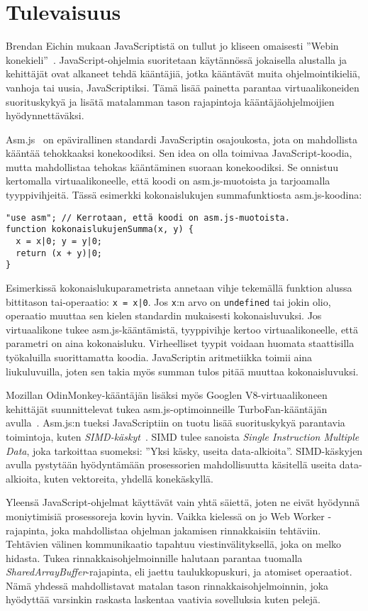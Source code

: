\section{Tulevaisuus}

Brendan Eichin mukaan JavaScriptistä on tullut jo kliseen omaisesti ''Webin konekieli''~\cite{webassembly}. JavaScript-ohjelmia suoritetaan käytännössä jokaisella alustalla ja kehittäjät ovat alkaneet tehdä kääntäjiä, jotka kääntävät muita ohjelmointikieliä, vanhoja tai uusia, JavaScriptiksi. Tämä lisää painetta parantaa virtuaalikoneiden suorituskykyä ja lisätä matalamman tason rajapintoja kääntäjäohjelmoijien hyödynnettäväksi.

Asm.js~\cite{asmjs} on epävirallinen standardi JavaScriptin osajoukosta, jota on mahdollista kääntää tehokkaaksi konekoodiksi. Sen idea on olla toimivaa JavaScript-koodia, mutta mahdollistaa tehokas kääntäminen suoraan konekoodiksi. Se onnistuu kertomalla virtuaalikoneelle, että koodi on asm.js-muotoista ja tarjoamalla tyyppivihjeitä. Tässä esimerkki kokonaislukujen summafunktiosta asm.js-koodina:
\begin{lstlisting}
"use asm"; // Kerrotaan, että koodi on asm.js-muotoista.
function kokonaislukujenSumma(x, y) {
  x = x|0; y = y|0;
  return (x + y)|0;
}
\end{lstlisting}
Esimerkissä kokonaislukuparametrista annetaan vihje tekemällä funktion alussa bittitason tai-operaatio: \texttt{x = x|0}. Jos \texttt{x}:n arvo on \texttt{undefined} tai jokin olio, operaatio muuttaa sen kielen standardin mukaisesti kokonaisluvuksi. Jos virtuaalikone tukee asm.js-kääntämistä, tyyppivihje kertoo virtuaalikoneelle, että parametri on aina kokonaisluku. Virheelliset tyypit voidaan huomata staattisilla työkaluilla suorittamatta koodia. JavaScriptin aritmetiikka toimii aina liukuluvuilla, joten sen takia myös summan tulos pitää muuttaa kokonaisluvuksi.

Mozillan OdinMonkey-kääntäjän lisäksi myös Googlen V8-virtuaalikoneen kehittäjät suunnittelevat tukea asm.js-optimoinneille TurboFan-kääntäjän avulla~\cite{turbofan}. Asm.js:n tueksi JavaScriptiin on tuotu lisää suorituskykyä parantavia toimintoja, kuten \textit{SIMD-käskyt}~\cite{webassembly}. SIMD tulee sanoista \textit{Single Instruction Multiple Data}, joka tarkoittaa suomeksi: ''Yksi käsky, useita data-alkioita''. SIMD-käskyjen avulla pystytään hyödyntämään prosessorien mahdollisuutta käsitellä useita data-alkioita, kuten vektoreita, yhdellä konekäskyllä.

Yleensä JavaScript-ohjelmat käyttävät vain yhtä säiettä, joten ne eivät hyödynnä moniytimisiä prosessoreja kovin hyvin. Vaikka kielessä on jo Web Worker -rajapinta, joka mahdollistaa ohjelman jakamisen rinnakkaisiin tehtäviin. Tehtävien välinen kommunikaatio tapahtuu viestinvälityksellä, joka on melko hidasta. Tukea rinnakkaisohjelmoinnille halutaan parantaa tuomalla \textit{SharedArrayBuffer}-rajapinta, eli jaettu taulukkopuskuri, ja atomiset operaatiot. Nämä yhdessä mahdollistavat matalan tason rinnakkaisohjelmoinnin, joka hyödyttää varsinkin raskasta laskentaa vaativia sovelluksia kuten pelejä.


